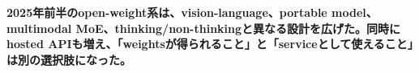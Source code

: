 \noindent\textbf{2025年前半のopen-weight系は、vision-language、portable model、multimodal MoE、thinking/non-thinkingと異なる設計を広げた。同時にhosted APIも増え、「weightsが得られること」と「serviceとして使えること」は別の選択肢になった。}\autocite{src-05f285e9757b,src-1bb16d7254b1,src-3e4a3f3b3d83,src-dc21f366b638}
